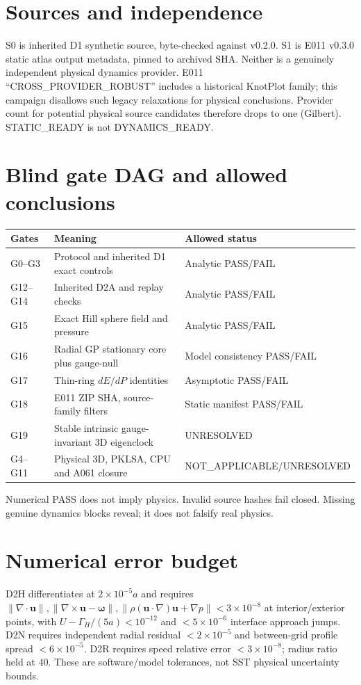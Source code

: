 \documentclass[10pt,a4paper]{article}
\begin{document}
\section{Sources and independence}
S0 is inherited D1 synthetic source, byte-checked against v0.2.0. S1 is E011 v0.3.0 static atlas output metadata, pinned to archived SHA. Neither is a genuinely independent physical dynamics provider. E011 ``CROSS\_PROVIDER\_ROBUST'' includes a historical KnotPlot family; this campaign disallows such legacy relaxations for physical conclusions. Provider count for potential physical source candidates therefore drops to one (Gilbert). STATIC\_READY is not DYNAMICS\_READY.
\section{Blind gate DAG and allowed conclusions}
\begin{longtable}{p{.13\linewidth}p{.45\linewidth}p{.30\linewidth}}\toprule
Gates&Meaning&Allowed status\\\midrule
G0--G3&Protocol and inherited D1 exact controls&Analytic PASS/FAIL\\
G12--G14&Inherited D2A and replay checks&Analytic PASS/FAIL\\
G15&Exact Hill sphere field and pressure&Analytic PASS/FAIL\\
G16&Radial GP stationary core plus gauge-null&Model consistency PASS/FAIL\\
G17&Thin-ring $dE/dP$ identities&Asymptotic PASS/FAIL\\
G18&E011 ZIP SHA, source-family filters&Static manifest PASS/FAIL\\
G19&Stable intrinsic gauge-invariant 3D eigenclock&UNRESOLVED\\
G4--G11&Physical 3D, PKLSA, CPU and A061 closure&NOT\_APPLICABLE/UNRESOLVED\\\bottomrule\end{longtable}
Numerical PASS does not imply physics. Invalid source hashes fail closed. Missing genuine dynamics blocks reveal; it does not falsify real physics.
\section{Numerical error budget}
D2H differentiates at $2\times10^{-5}a$ and requires $\|\nabla\cdot\mathbf u\|,\|\nabla\times\mathbf u-\boldsymbol\omega\|,\|\rho(\mathbf u\cdot\nabla)\mathbf u+\nabla p\|<3\times10^{-8}$ at interior/exterior points, with $U-\Gamma_H/(5a)<10^{-12}$ and $<5\times10^{-6}$ interface approach jumps. D2N requires independent radial residual $<2\times10^{-5}$ and between-grid profile spread $<6\times10^{-5}$. D2R requires speed relative error $<3\times10^{-8}$; radius ratio held at 40. These are software/model tolerances, not SST physical uncertainty bounds.
\end{document}
